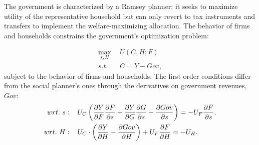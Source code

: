 The government is characterized by a Ramsey planner: it seeks to maximize utility of the representative household but can only revert to tax instruments and transfers to implement the welfare-maximizing allocation. The behavior of firms and households constrains the government's optimization problem:

\begin{align}
\underset{s, H}{\max}\ &\ U(C,H; F)\\ s.t.\ \ & \  C=Y-Gov,
\end{align}
subject to the behavior of firms and households.
The first order conditions differ from the social planner's ones through the derivatives on government revenues, $Gov$:
\begin{align}
wrt.\ s:\hspace{4mm} & U_C\left(\frac{\partial Y}{\partial F}\frac{\partial F}{\partial s}+\frac{\partial Y}{\partial G}\frac{\partial G}{\partial s}-\frac{\partial Gov}{ \partial s}\right)=-U_F\frac{\partial F}{\partial s}, \label{eq:sbs}
\\
wrt.\ H:\hspace{4mm} & U_C\cdot \left(\frac{\partial Y}{\partial H}-\frac{\partial Gov}{\partial H}\right)+U_F\frac{\partial F}{\partial H}=-U_H\label{eq:sbh}. 
\end{align}

